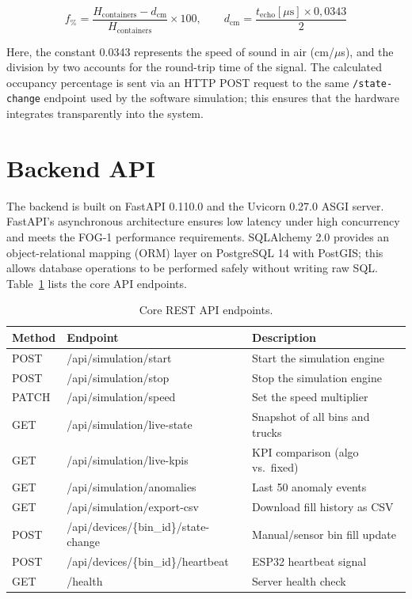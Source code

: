\documentclass[12pt,a4paper]{report}
\begin{document}
\begin{equation}
  f_{\%} = \frac{H_{\text{containers}} - d_{\text{cm}}}{H_{\text{containers}}} \times 100, \qquad
  d_{\text{cm}} = \frac{t_{\text{echo}}[\mu\text{s}] \times 0{,}0343}{2}
  \label{eq:fill_from_dist}
\end{equation}

\indent Here, the constant 0.0343 represents the speed of sound in air (cm/$\mu$s), and the division by two accounts for the round-trip time of the signal. The calculated occupancy percentage is sent via an HTTP POST request to the same \texttt{/state-change} endpoint used by the software simulation; this ensures that the hardware integrates transparently into the system.

\section{Backend API}

\indent The backend is built on FastAPI 0.110.0 and the Uvicorn 0.27.0 ASGI server. FastAPI’s asynchronous architecture ensures low latency under high concurrency and meets the FOG-1 performance requirements. SQLAlchemy 2.0 provides an object-relational mapping (ORM) layer on PostgreSQL 14 with PostGIS; this allows database operations to be performed safely without writing raw SQL. Table~\ref{tab:api} lists the core API endpoints.

\begin{table}[H]
\centering
\caption{Core REST API endpoints.}
\label{tab:api}
\begin{tabular}{lll}
\toprule
\textbf{Method} & \textbf{Endpoint} & \textbf{Description} \\
\midrule
POST  & /api/simulation/start           & Start the simulation engine \\
POST  & /api/simulation/stop            & Stop the simulation engine \\
PATCH & /api/simulation/speed           & Set the speed multiplier \\
GET   & /api/simulation/live-state      & Snapshot of all bins and trucks \\
GET   & /api/simulation/live-kpis       & KPI comparison (algo vs.\ fixed) \\
GET   & /api/simulation/anomalies       & Last 50 anomaly events \\
GET   & /api/simulation/export-csv      & Download fill history as CSV \\
POST  & /api/devices/\{bin\_id\}/state-change & Manual/sensor bin fill update \\
POST  & /api/devices/\{bin\_id\}/heartbeat    & ESP32 heartbeat signal \\
GET   & /health                         & Server health check \\
\bottomrule
\end{tabular}
\end{table}
\end{document}
